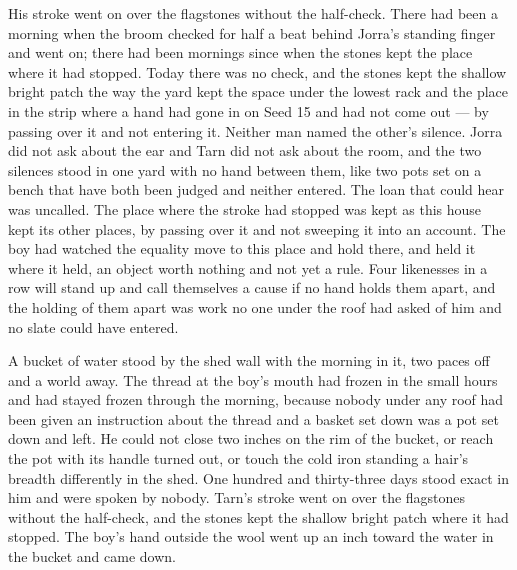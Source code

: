 His stroke went on over the flagstones without the half-check. There had been a morning when the broom checked for half a beat behind Jorra's standing finger and went on; there had been mornings since when the stones kept the place where it had stopped. Today there was no check, and the stones kept the shallow bright patch the way the yard kept the space under the lowest rack and the place in the strip where a hand had gone in on Seed 15 and had not come out --- by passing over it and not entering it. Neither man named the other's silence. Jorra did not ask about the ear and Tarn did not ask about the room, and the two silences stood in one yard with no hand between them, like two pots set on a bench that have both been judged and neither entered. The loan that could hear was uncalled. The place where the stroke had stopped was kept as this house kept its other places, by passing over it and not sweeping it into an account. The boy had watched the equality move to this place and hold there, and held it where it held, an object worth nothing and not yet a rule. Four likenesses in a row will stand up and call themselves a cause if no hand holds them apart, and the holding of them apart was work no one under the roof had asked of him and no slate could have entered.

A bucket of water stood by the shed wall with the morning in it, two paces off and a world away. The thread at the boy's mouth had frozen in the small hours and had stayed frozen through the morning, because nobody under any roof had been given an instruction about the thread and a basket set down was a pot set down and left. He could not close two inches on the rim of the bucket, or reach the pot with its handle turned out, or touch the cold iron standing a hair's breadth differently in the shed. One hundred and thirty-three days stood exact in him and were spoken by nobody. Tarn's stroke went on over the flagstones without the half-check, and the stones kept the shallow bright patch where it had stopped. The boy's hand outside the wool went up an inch toward the water in the bucket and came down.
